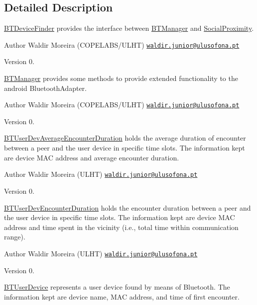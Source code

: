 \subsection{Detailed Description}
\hyperlink{interfacecom_1_1social_1_1proximity_1_1_b_t_device_finder}{B\+T\+Device\+Finder} provides the interface between \hyperlink{classcom_1_1social_1_1proximity_1_1_b_t_manager}{B\+T\+Manager} and \hyperlink{classcom_1_1social_1_1proximity_1_1_social_proximity}{Social\+Proximity}.

\begin{DoxyAuthor}{Author}
Waldir Moreira (C\+O\+P\+E\+L\+A\+B\+S/\+U\+L\+H\+T) \href{mailto:waldir.junior@ulusofona.pt}{\tt waldir.\+junior@ulusofona.\+pt}
\end{DoxyAuthor}
\begin{DoxyVersion}{Version}
0.
\end{DoxyVersion}
\hyperlink{classcom_1_1social_1_1proximity_1_1_b_t_manager}{B\+T\+Manager} provides some methods to provide extended functionality to the android Bluetooth\+Adapter.

\begin{DoxyAuthor}{Author}
Waldir Moreira (C\+O\+P\+E\+L\+A\+B\+S/\+U\+L\+H\+T) \href{mailto:waldir.junior@ulusofona.pt}{\tt waldir.\+junior@ulusofona.\+pt}
\end{DoxyAuthor}
\begin{DoxyVersion}{Version}
0.
\end{DoxyVersion}
\hyperlink{classcom_1_1social_1_1proximity_1_1_b_t_user_dev_average_encounter_duration}{B\+T\+User\+Dev\+Average\+Encounter\+Duration} holds the average duration of encounter between a peer and the user device in specific time slots. The information kept are device M\+A\+C address and average encounter duration.

\begin{DoxyAuthor}{Author}
Waldir Moreira (U\+L\+H\+T) \href{mailto:waldir.junior@ulusofona.pt}{\tt waldir.\+junior@ulusofona.\+pt}
\end{DoxyAuthor}
\begin{DoxyVersion}{Version}
0.
\end{DoxyVersion}
\hyperlink{classcom_1_1social_1_1proximity_1_1_b_t_user_dev_encounter_duration}{B\+T\+User\+Dev\+Encounter\+Duration} holds the encounter duration between a peer and the user device in specific time slots. The information kept are device M\+A\+C address and time spent in the vicinity (i.\+e., total time within communication range).

\begin{DoxyAuthor}{Author}
Waldir Moreira (U\+L\+H\+T) \href{mailto:waldir.junior@ulusofona.pt}{\tt waldir.\+junior@ulusofona.\+pt}
\end{DoxyAuthor}
\begin{DoxyVersion}{Version}
0.
\end{DoxyVersion}
\hyperlink{classcom_1_1social_1_1proximity_1_1_b_t_user_device}{B\+T\+User\+Device} represents a user device found by means of Bluetooth. The information kept are device name, M\+A\+C address, and time of first encounter.

